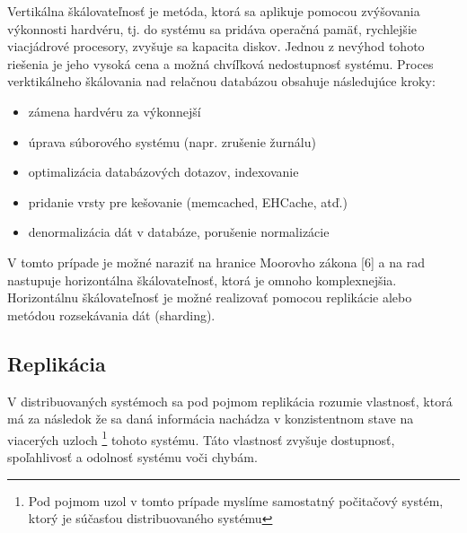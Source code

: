 \documentclass[11pt,twoside,a4paper]{book}
\begin{document}
Vertikálna škálovateľnosť je metóda, ktorá sa aplikuje pomocou zvýšovania výkonnosti hardvéru, tj. do systému sa pridáva operačná pamäť, rychlejšie viacjádrové procesory, zvyšuje sa kapacita diskov. Jednou z nevýhod tohoto riešenia je jeho vysoká cena a možná chvíľková nedostupnosť systému. 
Proces verktikálneho škálovania nad relačnou databázou obsahuje následujúce kroky:
\begin{itemize}
 \item zámena hardvéru za výkonnejší
 \item úprava súborového systému (napr. zrušenie žurnálu)
 \item optimalizácia databázových dotazov, indexovanie
 \item pridanie vrsty pre kešovanie (memcached, EHCache, atď.)
 \item denormalizácia dát v databáze, porušenie normalizácie
\end{itemize}

V tomto prípade je možné naraziť na hranice Moorovho zákona [6] a na rad nastupuje horizontálna škálovateľnosť, ktorá je omnoho komplexnejšia. Horizontálnu škálovateľnosť je možné realizovať pomocou replikácie alebo metódou rozsekávania dát (sharding).

\subsection{Replikácia}

V distribuovaných systémoch sa pod pojmom replikácia rozumie vlastnosť, ktorá má za následok že sa daná informácia nachádza v konzistentnom stave na viacerých uzloch \footnote{Pod pojmom uzol v tomto prípade myslíme samostatný počitačový systém, ktorý je súčasťou distribuovaného systému} tohoto systému. Táto vlastnosť zvyšuje dostupnosť, spoľahlivosť a odolnosť systému voči chybám.
\end{document}
